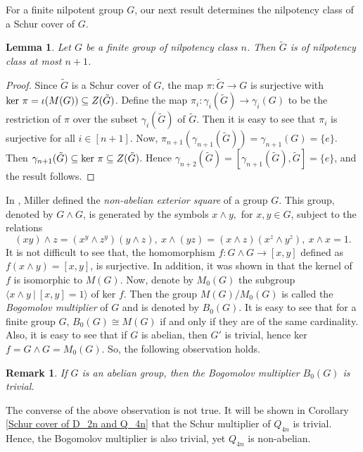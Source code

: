 \documentclass[12pt,a4paper]{article}
\newtheorem{lemma}[theorem]{Lemma}
\newtheorem{remark}[theorem]{Remark}
\begin{document}
For a finite nilpotent group $G$, our next result determines the nilpotency class of a Schur cover of $G$.
\begin{lemma}\label{schur_cover_nilpotency}
Let $G$ be a finite group of nilpotency class $n$. Then $\tilde{G}$ is of nilpotency class at most $n+1$.    
\end{lemma}

\begin{proof}
Since $\tilde{G}$ is a Schur cover of $G$, the map $\pi:\tilde{G}\rightarrow G$ is surjective with ${\rm ker~} \pi=\iota(M(G))\subseteq Z(\tilde{G})$. Define the map $\pi_i:\gamma_i(\tilde{G})\rightarrow\gamma_i(G)$ to be the restriction of $\pi$ over the subset $\gamma_i(\tilde{G})$ of $\tilde{G}$. Then it is easy to see that $\pi_i$ is surjective for all $i\in[n+1]$. Now, $\pi_{n+1}(\gamma_{n+1}(\tilde{G}))=\gamma_{n+1}(G)=\{e\}$. Then $\gamma_{n+1}(\tilde{G})\subseteq {\rm ker}~\pi\subseteq Z(\tilde{G})$. Hence $\gamma_{n+2}(\tilde{G})=[\gamma_{n+1}(\tilde{G}),\tilde{G}]=\{e\}$, and the result follows.
\end{proof}

In \cite{miller}, Miller defined the \textit{non-abelian exterior square} of a group $G$. This group, denoted by $G\wedge G$, is generated by the symbols $x \wedge y,$ for $x, y \in G$, subject to the relations
\[
(xy)\wedge z=(x^y \wedge z^y)(y\wedge z), ~x\wedge (yz)= (x\wedge z)(x^z\wedge y^z), ~x\wedge x = 1.
\]
It is not difficult to see that, the homomorphism $f:G\wedge G\rightarrow[x,y]$ defined as $f(x\wedge y)=[x,y]$, is surjective. In addition, it was shown in \cite[Theorem 2]{miller} that the kernel of $f$ is isomorphic to $M(G)$. Now, denote by $M_0(G)$ the subgroup $\langle x\wedge y~|~[x, y] = 1 \rangle$ of ker $f$. Then the group $M(G)/M_0(G)$ is called the \textit{Bogomolov multiplier} of $G$ and is denoted by $B_0(G)$. It is easy to see that for a finite group $G$, $B_0(G)\cong M(G)$ if and only if they are of the same cardinality. Also, it is easy to see that if $G$ is abelian, then $G'$ is trivial, hence ker $f=G\wedge G=M_0(G)$. So, the following observation holds.
\begin{remark}\label{bgo_ab}
If $G$ is an abelian group, then the Bogomolov multiplier $B_0(G)$ is trivial.    
\end{remark}

The converse of the above observation is not true. It will be shown in Corollary \ref{Schur cover of D_2n and Q_4n} that the Schur multiplier of $Q_{4n}$ is trivial. Hence, the Bogomolov multiplier is also trivial, yet $Q_{4n}$ is non-abelian.
\end{document}
